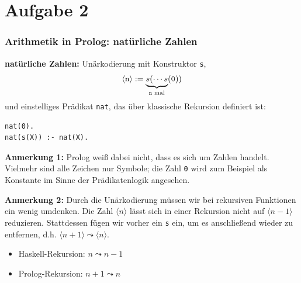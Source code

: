 \documentclass{beamer}
\newcommand{\num}[1]{\ensuremath{\langle #1 \rangle}}
\begin{document}


\section{Aufgabe 2}

\begin{frame}[fragile] \frametitle{Arithmetik in Prolog: natürliche Zahlen}
	\footnotesize
	\textbf{natürliche Zahlen:} Unärkodierung mit Konstruktor \texttt{s}, 
	\begin{equation*}
		\mathtt{
		\num{n} \defeq \underbrace{s( \cdots s}_{n \text{ mal}} (0))
		}
	\end{equation*}
	und einstelliges Prädikat \texttt{nat}, das über klassische Rekursion definiert ist:
	\begin{lstlisting}[frame=l]
nat(0).
nat(s(X)) :- nat(X).
	\end{lstlisting}

	\pause \scriptsize
	
	\textbf{Anmerkung 1:} Prolog weiß dabei nicht, dass es sich um Zahlen handelt. Vielmehr sind alle Zeichen nur Symbole; die Zahl \texttt{0} wird zum Beispiel als Konstante im Sinne der Prädikatenlogik angesehen.
	\pause
	
	\textbf{Anmerkung 2:} Durch die Unärkodierung müssen wir bei rekursiven Funktionen ein wenig umdenken. Die Zahl $\num{n}$ lässt sich in einer Rekursion nicht auf $\num{n-1}$ reduzieren. Stattdessen fügen wir vorher ein \texttt{s} ein, um es anschließend wieder zu entfernen, d.h. $\num{n+1} \leadsto \num{n}$.
	\begin{itemize}
		\item Haskell-Rekursion: $n \leadsto n-1$
		\item Prolog-Rekursion: $n+1 \leadsto n$
	\end{itemize}

\end{frame}
\end{document}
